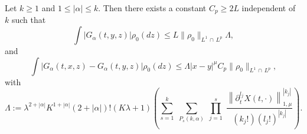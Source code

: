 \documentclass[AHL,Unicode,longabstracts,published]{cedram}
\renewcommand{\leq}{\leqslant}
\renewcommand{\geq}{\geqslant}
\begin{document}
\begin{lemm}\label{lemme_Miot_general}
Let $k\geq 1$ and $1\leq |\alpha|\leq k$. Then there exists a constant $C_p\geq 2L$ independent of $k$ such that
\begin{equation}\label{Rapp}
\int \left|G_\alpha(t,y,z) \right|\rho_0(dz) \leq L \|\rho_0\|_{L^1\,\cap\,L^p} \Lambda,
\end{equation}
and
\begin{equation}\label{Rapp-diff}
\int \left|G_\alpha(t,x,z)-G_\alpha(t,y,z)\right| \rho_0(dz) \leq \Lambda |x-y|^\mu C_p\|\rho_0\|_{L^1\,\cap\,L^p},
\end{equation}
with
\begin{equation}\label{def-Lamb}
\Lambda:= \lambda^{2+|\alpha|} K^{1+|\alpha|}(2+|\alpha|)! \left(K\lambda+1 \right)\left(\underset{s=1}{\overset{k}{\sum}}\;\underset{P_s(k,\alpha)}{\sum}\;\underset{j=1}{\overset{s}{\prod}}\;\frac{\left\|\partial_t^{l_j}X(t,\cdot) \right\|_{1,\mu}^{\left|k_j\right|}}{\left(k_j!\right) \left(l_j!\right)^{\left|k_j\right|}}\right).
\end{equation}
\end{lemm}
\end{document}
